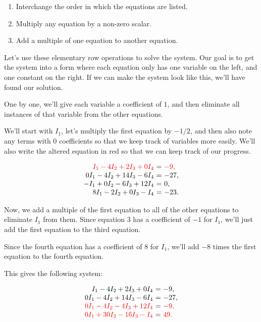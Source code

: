 \documentclass{ximera}
\begin{document}
\begin{example}
\begin{solution}
\begin{definition}
    \begin{enumerate}
    \item Interchange the order in which the equations are listed.
  
    \item Multiply any equation by a non-zero scalar.
  
    \item Add a multiple of one equation to another equation.
    \end{enumerate}
  \end{definition}

  

  Let's use these elementary row operations to solve the system. Our goal is to get the system into a form where each equation only has one variable on the left, and one constant on the right. If we can make the system look like this, we'll have found our solution.

  One by one, we'll give each variable a coefficient of $1$, and then eliminate all instances of that variable from the other equations. 
  
  We'll start with $I_1$, let's multiply the first equation by $-1/2$, and then also note any terms with $0$ coefficients so that we keep track of variables more easily. We'll also write the altered equation in red so that we can keep track of our progress.

  \begin{equation*}
    \begin{array}{r@{~}c@{~}l}
      \color{red}I_1-4I_2+2I_3+0I_4&=&\color{red}-9, \\
      0I_1- 4I_2 + 14I_3 - 6I_4 &=& -27, \\
      -I_1 +0I_2 - 6I_3 + 12I_4 &=& 0, \\
      8I_1-2I_2 +0I_3 - I_4 &=& -23.
    \end{array}
  \end{equation*}

  Now, we add a multiple of the first equation to all of the other equations to eliminate $I_1$ from them. Since equation 3 has a coefficient of $-1$ for $I_1$, we'll just add the first equation to the third equation. 

  Since the fourth equation has a coefficient of $8$ for $I_1$, we'll add $-8$ times the first equation to the fourth equation.

  This gives the following system:

  \begin{equation*}
    \begin{array}{r@{~}c@{~}l}
      I_1-4I_2+2I_3+0I_4&=&-9, \\
      0I_1- 4I_2 + 14I_3 - 6I_4 &=& -27, \\
      \color{red}0I_1 - 4I_2 - 4I_3 + 12I_4 &=& \color{red}-9, \\
      \color{red}0I_1+30I_2 - 16I_3 - I_4 &=& \color{red}49.
    \end{array}
  \end{equation*}


\end{solution}
\end{example}
\end{document}
